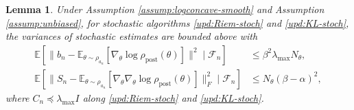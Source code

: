 \documentclass[11pt]{article}
\theoremstyle{plain}
\newtheorem{lemma}[theorem]{Lemma}
\theoremstyle{definition}
\theoremstyle{remark}
\begin{document}
\begin{lemma}\label{lem:var-bound-stoch}
    Under Assumption \ref{assump:logconcave-smooth} and Assumption \ref{assump:unbiased}, for stochastic algorithms \eqref{upd:Riem-stoch} and \eqref{upd:KL-stoch}, the variances of stochastic estimates are bounded above with
    \begin{align*}
         \mathbb{E} [\| b_n - \mathbb{E}_{\theta \sim \rho_{a_n}} [\nabla_\theta \log \rho_\mathrm{post} (\theta)] \|^2 \mid \mathcal{F}_n] &\leq \beta^2 \lambda_{\max} N_\theta,\\
         \mathbb{E} [\| S_n - \mathbb{E}_{\theta \sim \rho_{a_n}} [\nabla_\theta \nabla_\theta \log \rho_\mathrm{post} (\theta)] \|_F^2 \mid \mathcal{F}_n] &\leq N_\theta (\beta - \alpha)^2,
    \end{align*}
    where $C_n \preceq \lambda_{\max} I$ along \eqref{upd:Riem-stoch} and \eqref{upd:KL-stoch}.
\end{lemma}
\end{document}
